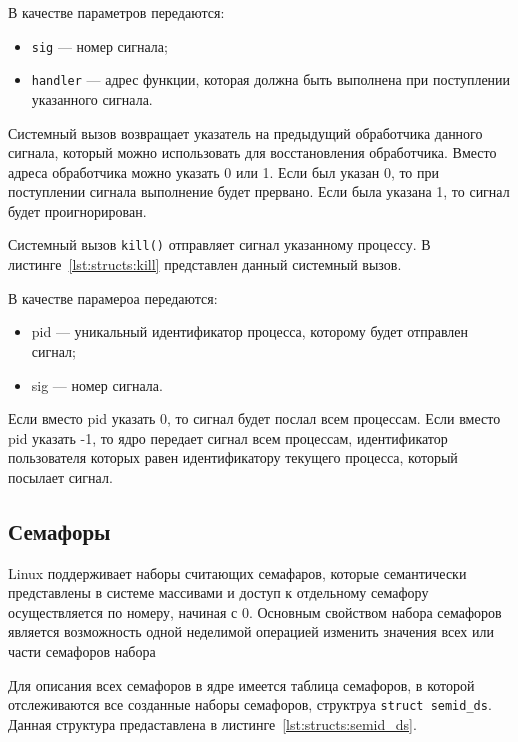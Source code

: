 

\clearpage

В качестве параметров передаются:
\begin{itemize}
	\item \texttt{sig} --- номер сигнала;
	\item \texttt{handler} --- адрес функции, которая должна быть выполнена при поступлении указанного сигнала.
\end{itemize}

Системный вызов возвращает указатель на предыдущий обработчика данного сигнала, который можно использовать для восстановления обработчика. 
Вместо адреса обработчика можно указать 0 или 1. 
Если был указан 0, то при поступлении сигнала выполнение будет прервано. 
Если была указана 1, то сигнал будет проигнорирован. 

Системный вызов \texttt{kill()} отправляет сигнал указанному процессу. В листинге~\ref{lst:structs:kill} представлен данный системный вызов.



В качестве парамероа передаются:
\begin{itemize}
	\item pid --- уникальный идентификатор процесса, которому будет отправлен сигнал;
	\item sig --- номер сигнала.
\end{itemize}

Если вместо pid указать 0, то сигнал будет послал  всем процессам. 
Если вместо pid указать -1, то ядро  передает сигнал всем процессам, идентификатор пользователя которых равен идентификатору текущего  процесса, который посылает сигнал.

\subsection{Семафоры}

Linux поддерживает наборы считающих семафаров, которые семантически представлены в системе массивами и доступ к отдельному семафору осуществляется по номеру, начиная с 0. 
Основным свойством набора семафоров является возможность одной неделимой операцией изменить значения всех или части семафоров набора

Для описания всех семафоров в ядре имеется таблица семафоров, в которой отслеживаются все созданные наборы семафоров, структруа \texttt{struct semid\_ds}. Данная структура предаставлена в листинге~\ref{lst:structs:semid_ds}.

